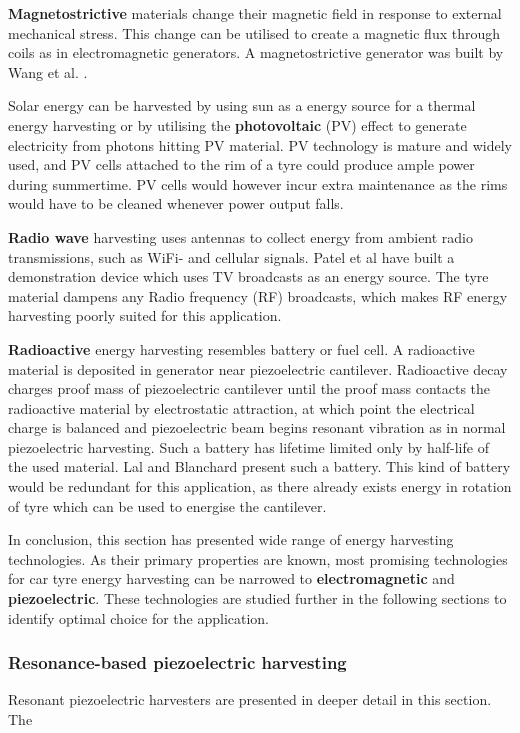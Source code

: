 \textbf{Magnetostrictive} materials change their magnetic field in response to external mechanical stress. This change can be utilised to create a magnetic flux through coils as in electromagnetic generators. A magnetostrictive generator was built by Wang et al. \cite{Wang2006}. 

Solar energy can be harvested by using sun as a energy source for a thermal energy harvesting or by utilising the \textbf{photovoltaic} (PV) effect to generate electricity from photons hitting PV material. PV technology is mature and widely used, and PV cells attached to the rim of a tyre could produce ample power during summertime. PV cells would however incur extra maintenance as the rims would have to be cleaned whenever power output falls. 

\textbf{Radio wave} harvesting uses antennas to collect energy from ambient radio transmissions, such as WiFi- and cellular signals. Patel et al \cite{Patel2014} have built a demonstration device which uses TV broadcasts as an energy source. The tyre material dampens any Radio frequency (RF) broadcasts, which makes RF energy harvesting poorly suited for this application.

\textbf{Radioactive} energy harvesting resembles battery or fuel cell. A radioactive material is deposited in generator near piezoelectric cantilever. Radioactive decay charges proof mass of piezoelectric cantilever until the proof mass contacts the radioactive material by electrostatic attraction, at which point the electrical charge is balanced and piezoelectric beam begins resonant vibration as in normal piezoelectric harvesting. Such a battery has lifetime limited only by half-life of the used material. Lal and Blanchard \cite{Lal2004} present such a battery. This kind of battery would be redundant for this application, as there already exists energy in rotation of tyre which can be used to energise the cantilever. 

In conclusion, this section has presented wide range of energy harvesting technologies. As their primary properties are known, most promising technologies for car tyre energy harvesting can be narrowed to \textbf{electromagnetic} and \textbf{piezoelectric}. These technologies are studied further in the following sections to identify optimal choice for the application.

\subsubsection{Resonance-based piezoelectric harvesting}
Resonant piezoelectric harvesters are presented in deeper detail in this section. The 

